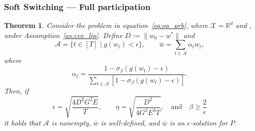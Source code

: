 \documentclass{article} %
\newtheorem{theorem}{Theorem}[]
\def\eqref#1{equation~\ref{#1}}
\def\R{{\mathbb{R}}}
\def\A{{\mathcal A}}
\begin{document}
\subsubsection{Soft Switching --- Full participation}
\begin{theorem}
\label{thm:fedssgm}
Consider the problem in \eqref{eq:op_prb}, where $\mathcal{X} = \R^d$ and , under Assumption~\ref{as:cvx_lip}. Define $D:=\|w_0-w^*\|$ and
\begin{equation*}
\A = \{t\in [T]\;| \;g(w_{t})< \epsilon\}, \qquad \bar{w} = \sum_{t\in \A} \alpha_t w_t,
 \end{equation*}
 where 
    \begin{equation}
        \alpha_t = \frac{1-\sigma_\beta(g(w_t)-\epsilon)}{\sum_{t\in \A} [1-\sigma_\beta(g(w_t)-\epsilon)]}.
    \end{equation}
Then, if
\begin{equation*}
\epsilon = \sqrt{\frac{{4 D^2 G^2 E}}{{T}}}, \qquad \eta = \sqrt{\frac{D^2}{4G^2 E^3 T}}, \quad \text{and} \quad \beta \geq \frac{2}{\epsilon} 
 \end{equation*}
it holds that $\A$ is nonempty, $\bar{w}$ is well-defined, and $\bar{w}$ is an $\epsilon$-solution for $P$.
\end{theorem}
\end{document}
